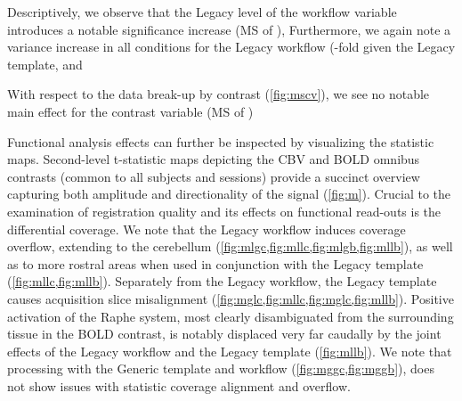 Descriptively, we observe that the Legacy level of the workflow variable introduces a notable significance increase
(MS of ),
Furthermore, we again note a variance increase in all conditions for the Legacy workflow
(-fold
given the Legacy template, and

With respect to the data break-up by contrast (\cref{fig:mscv}), we see no notable main effect for the contrast variable
(MS of )

Functional analysis effects can further be inspected by visualizing the statistic maps.
Second-level t-statistic maps depicting the CBV and BOLD omnibus contrasts (common to all subjects and sessions) provide a succinct overview capturing both amplitude and directionality of the signal (\cref{fig:m}).
Crucial to the examination of registration quality and its effects on functional read-outs is the differential coverage.
We note that the Legacy workflow induces coverage overflow, extending to the cerebellum (\cref{fig:mlgc,fig:mllc,fig:mlgb,fig:mllb}), as well as to more rostral areas when used in conjunction with the Legacy template (\cref{fig:mllc,fig:mllb}).
Separately from the Legacy workflow, the Legacy template causes acquisition slice misalignment (\cref{fig:mglc,fig:mllc,fig:mglc,fig:mllb}).
Positive activation of the Raphe system, most clearly disambiguated from the surrounding tissue in the BOLD contrast, is notably displaced very far caudally by the joint effects of the Legacy workflow and the Legacy template (\cref{fig:mllb}).
We note that processing with the Generic template and workflow (\cref{fig:mggc,fig:mggb}), does not show issues with statistic coverage alignment and overflow.


